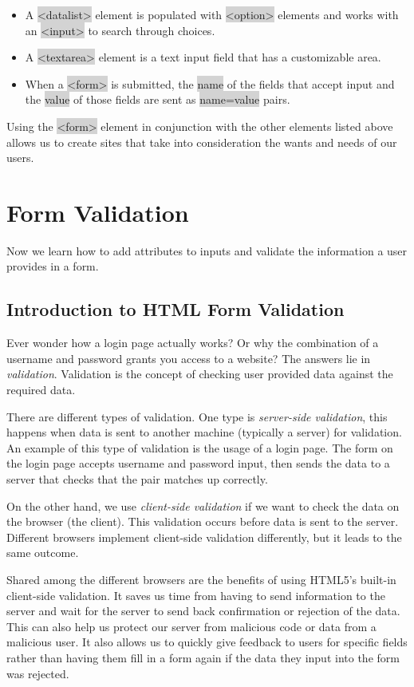 \documentclass[11pt]{article}
\begin{document}
\begin{itemize}[leftmargin = *]
\item A \colorbox{lightgray}{<datalist>} element is populated with \colorbox{lightgray}{<option>} elements and works with an \colorbox{lightgray}{<input>} to search through choices.
\item A \colorbox{lightgray}{<textarea>} element is a text input field that has a customizable area.
\item When a \colorbox{lightgray}{<form>} is submitted, the \colorbox{lightgray}{name} of the fields that accept input and the \colorbox{lightgray}{value} of those fields are sent as \colorbox{lightgray}{name=value} pairs.
\end{itemize}
Using the \colorbox{lightgray}{<form>} element in conjunction with the other elements listed above allows us to create sites that take into consideration the wants and needs of our users.

\newpage
\section{Form Validation}
Now we learn how to add attributes to inputs and validate the information a user provides in a form. 
\subsection{Introduction to HTML Form Validation}
Ever wonder how a login page actually works? Or why the combination of a username and password grants you access to a website? The answers lie in \textit{validation}. Validation is the concept of checking user provided data against the required data.

There are different types of validation. One type is \textit{server-side validation}, this happens when data is sent to another machine (typically a server) for validation. An example of this type of validation is the usage of a login page. The form on the login page accepts username and password input, then sends the data to a server that checks that the pair matches up correctly.

On the other hand, we use \textit{client-side validation} if we want to check the data on the browser (the client). This validation occurs before data is sent to the server. Different browsers implement client-side validation differently, but it leads to the same outcome.

Shared among the different browsers are the benefits of using HTML5’s built-in client-side validation. It saves us time from having to send information to the server and wait for the server to send back confirmation or rejection of the data. This can also help us protect our server from malicious code or data from a malicious user. It also allows us to quickly give feedback to users for specific fields rather than having them fill in a form again if the data they input into the form was rejected.
\end{document}
